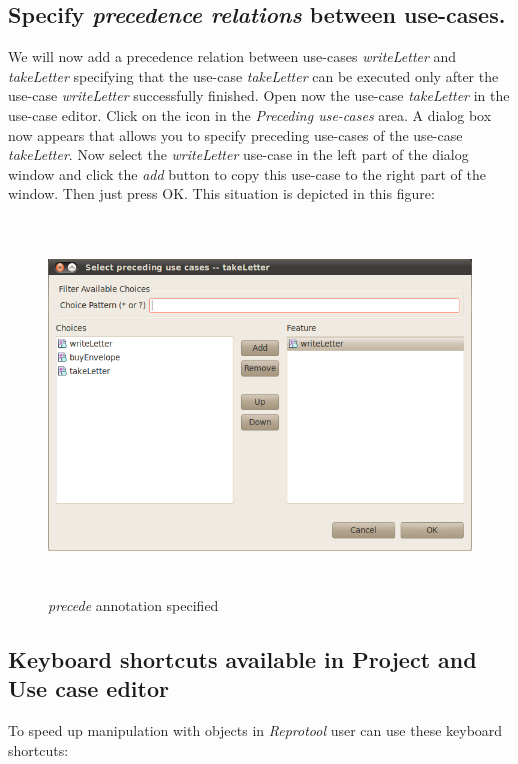 \newpage

\subsection{Specify \emph{precedence relations} between use-cases.}

We will now add a precedence relation between use-cases \emph{writeLetter} and \emph{takeLetter} specifying that the use-case
\emph{takeLetter} can be executed only after the use-case \emph{writeLetter} successfully finished. Open now the use-case
\emph{takeLetter} in the use-case editor. Click on the icon in the \emph{Preceding use-cases} area. A dialog box now appears that
allows you to specify preceding use-cases of the use-case \emph{takeLetter}. Now select the \emph{writeLetter} use-case in the left part
of the dialog window and click the \emph{add} button to copy this use-case to the right part of the window. Then just press OK. This
situation is depicted in this figure:

\begin{figure}[ht]
  \centering
  \includegraphics[height=280pt]{images/reprotoolPrecede}
  \caption{\emph{precede} annotation specified}
  \label{fig:reprotoolPrecede}
\end{figure}

\subsection{Keyboard shortcuts available in Project and Use case editor}

To speed up manipulation with objects in \emph{Reprotool} user can use these keyboard shortcuts:

